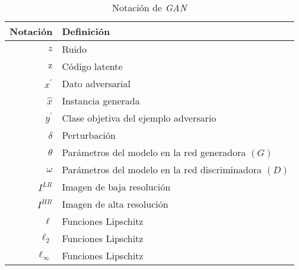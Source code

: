 \begin{table}[H]
    \begin{center}
        \begin{tabularx}{\textwidth}{|r|X|}
            \hline
            \textbf{Notación} & \textbf{Definición}                                  \\
            \hline %
            $ z $             & Ruido                                                \\
            $ \mathrm{z} $    & Código latente                                       \\
            $ x^{\prime} $    & Dato adversarial                                     \\
            $ \hat{x} $       & Instancia generada                                   \\
            $ y^{\prime} $    & Clase objetiva del ejemplo adversario                \\
            $ \delta $        & Perturbación                                         \\
            $ \theta $        & Parámetros del modelo en la red generadora $(G)$     \\
            $ \omega $        & Parámetros del modelo en la red discriminadora $(D)$ \\
            $I^{LR}$          & Imagen de baja resolución                            \\
            $I^{HR}$          & Imagen de alta resolución                            \\
            ${\ell}$          & Funciones Lipschitz                                  \\
            ${\ell_{2}}$      & Funciones Lipschitz                                  \\
            ${\ell_{\infty}}$ & Funciones Lipschitz                                  \\
            \hline
        \end{tabularx}
        \caption{Notación de \textit{GAN}}
        \label{tab:notation-part-gans}
    \end{center}
\end{table}



